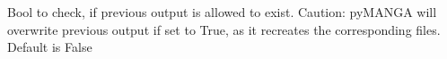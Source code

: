 Bool to check, if previous output is allowed to exist. Caution\+: py\+MANGA will overwrite previous output if set to True, as it recreates the corresponding files. Default is False 